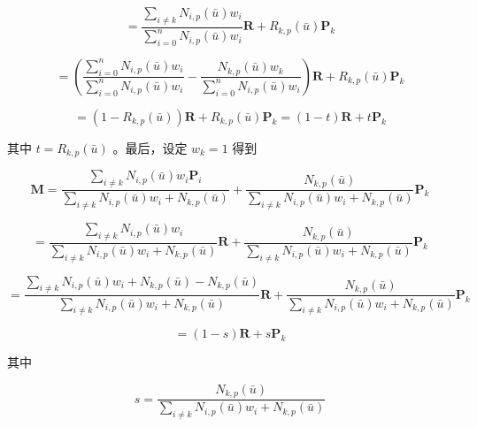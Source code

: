 \documentclass[../main.tex]{subfiles}
\begin{document}
\[
= \frac{\mathop{\sum }\limits_{{i \neq  k}}{N}_{i,p}\left( \bar{u}\right) {w}_{i}}{\mathop{\sum }\limits_{{i = 0}}^{n}{N}_{i,p}\left( \bar{u}\right) {w}_{i}}\mathbf{R} + {R}_{k,p}\left( \bar{u}\right) {\mathbf{P}}_{k}
\]

\[
= \left( {\frac{\mathop{\sum }\limits_{{i = 0}}^{n}{N}_{i,p}\left( \bar{u}\right) {w}_{i}}{\mathop{\sum }\limits_{{i = 0}}^{n}{N}_{i,p}\left( \bar{u}\right) {w}_{i}} - \frac{{N}_{k,p}\left( \bar{u}\right) {w}_{k}}{\mathop{\sum }\limits_{{i = 0}}^{n}{N}_{i,p}\left( \bar{u}\right) {w}_{i}}}\right) \mathbf{R} + {R}_{k,p}\left( \bar{u}\right) {\mathbf{P}}_{k}
\]

\[
= \left( {1 - {R}_{k,p}\left( \bar{u}\right) }\right) \mathbf{R} + {R}_{k,p}\left( \bar{u}\right) {\mathbf{P}}_{k} = \left( {1 - t}\right) \mathbf{R} + t{\mathbf{P}}_{k}
\]

其中 \(t = {R}_{k,p}\left( \bar{u}\right)\) 。最后，设定 \({w}_{k} = 1\) 得到

\[
\mathbf{M} = \frac{\mathop{\sum }\limits_{{i \neq  k}}{N}_{i,p}\left( \bar{u}\right) {w}_{i}{\mathbf{P}}_{i}}{\mathop{\sum }\limits_{{i \neq  k}}{N}_{i,p}\left( \bar{u}\right) {w}_{i} + {N}_{k,p}\left( \bar{u}\right) } + \frac{{N}_{k,p}\left( \bar{u}\right) }{\mathop{\sum }\limits_{{i \neq  k}}{N}_{i,p}\left( \bar{u}\right) {w}_{i} + {N}_{k,p}\left( \bar{u}\right) }{\mathbf{P}}_{k}
\]

\[
= \frac{\mathop{\sum }\limits_{{i \neq  k}}{N}_{i,p}\left( \bar{u}\right) {w}_{i}}{\mathop{\sum }\limits_{{i \neq  k}}{N}_{i,p}\left( \bar{u}\right) {w}_{i} + {N}_{k,p}\left( \bar{u}\right) }\mathbf{R} + \frac{{N}_{k,p}\left( \bar{u}\right) }{\mathop{\sum }\limits_{{i \neq  k}}{N}_{i,p}\left( \bar{u}\right) {w}_{i} + {N}_{k,p}\left( \bar{u}\right) }{\mathbf{P}}_{k}
\]

\[
= \frac{\mathop{\sum }\limits_{{i \neq  k}}{N}_{i,p}\left( \bar{u}\right) {w}_{i} + {N}_{k,p}\left( \bar{u}\right)  - {N}_{k,p}\left( \bar{u}\right) }{\mathop{\sum }\limits_{{i \neq  k}}{N}_{i,p}\left( \bar{u}\right) {w}_{i} + {N}_{k,p}\left( \bar{u}\right) }\mathbf{R} + \frac{{N}_{k,p}\left( \bar{u}\right) }{\mathop{\sum }\limits_{{i \neq  k}}{N}_{i,p}\left( \bar{u}\right) {w}_{i} + {N}_{k,p}\left( \bar{u}\right) }{\mathbf{P}}_{k}
\]

\[
= \left( {1 - s}\right) \mathbf{R} + s{\mathbf{P}}_{k}
\]

其中

\[
s = \frac{{N}_{k,p}\left( \bar{u}\right) }{\mathop{\sum }\limits_{{i \neq  k}}{N}_{i,p}\left( \bar{u}\right) {w}_{i} + {N}_{k,p}\left( \bar{u}\right) }
\]
\end{document}
